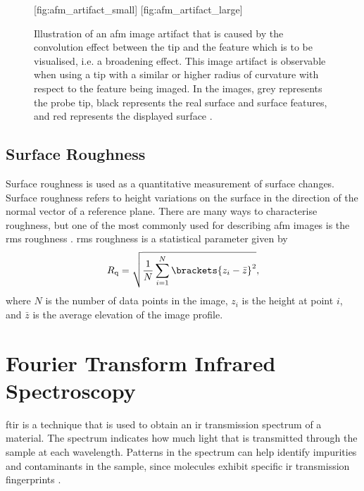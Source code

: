 \begin{figure}[htbp]
    \centering
    [fig:afm_artifact_small]
    \hfill
    [fig:afm_artifact_large]
    \caption[Illustration of the convolution effect in an \ac{afm} image due to tip size.]{Illustration of an \ac{afm} image artifact that is caused by the convolution effect between the tip and the feature which is to be visualised, i.e. a broadening effect. This image artifact is observable when using a tip with  a similar or  higher radius of curvature with respect to the feature being imaged. In the images, grey represents the probe tip, black represents the real surface and surface features, and red represents the displayed surface \citep[Adapted from][]{psia2002xe100}.}
    \label{fig:afm_tip-convolution}
\end{figure}

\subsection{Surface Roughness}

Surface roughness is used as a quantitative measurement of surface changes. Surface roughness refers to height variations on the surface in the direction of the normal vector of a reference plane. There are many ways to characterise roughness, but one of the most commonly used for describing \ac{afm} images is the \ac{rms} roughness \citep{eaton2010atomic}. \Ac{rms} roughness is a statistical parameter given by \citep{thomas1999amplitude}
\begin{equation}\label{eq:rmsroughness}
R_\textrm{q} = \sqrt{\frac{1}{N}\sum_{i=1}^{N}\brackets{z_i-\bar{z}}^2},
\end{equation}
where $N$ is the number of data points in the image, $z_i$ is the height at point $i$, and $\bar{z}$ is the average elevation of the image profile. %

\section{Fourier Transform Infrared Spectroscopy}\label{sec:ftir}
\Acf{ftir} is a technique that is used to obtain an \ac{ir} transmission spectrum of a material. The spectrum indicates how much light that is transmitted through the sample at each wavelength. Patterns in the spectrum can help identify impurities and contaminants in the sample, since molecules exhibit specific \ac{ir} transmission fingerprints \citep{smith2011fourier}.

